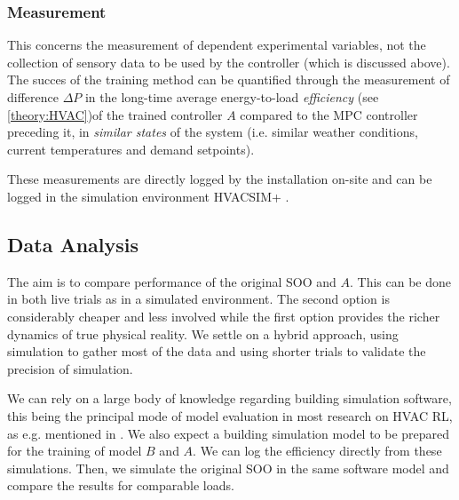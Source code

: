 \documentclass{article}
\theoremstyle{definition}
\theoremstyle{remark}
\begin{document}
\subsubsection{Measurement}\label{Method:DatAn}
This concerns the measurement of dependent experimental variables, not the collection of sensory data to be used by the controller (which is discussed above). The succes of the training method can be quantified through the measurement of difference $\Delta P$ in the long-time average energy-to-load \textit{efficiency} (see \ref{theory:HVAC})of the trained controller $A$ compared to the MPC controller preceding it, in \textit{similar states} of the system (i.e. similar weather conditions, current temperatures and demand setpoints).

These measurements are directly logged by the installation on-site and can be logged in the simulation environment HVACSIM+ \cite{Galler_2021}.

\subsection{Data Analysis}
The aim is to compare performance of the original SOO and $A$. This can be done in both live trials as in a simulated environment. The second option is considerably cheaper and less involved while the first option provides the richer dynamics of true physical reality. We settle on a hybrid approach, using simulation to gather most of the data and using shorter trials to validate the precision of simulation.

We can rely on a large body of knowledge regarding building simulation software, this being the principal mode of model evaluation in most research on HVAC RL, as e.g. mentioned in \cite{Yuetal}. We also expect a building simulation model to be prepared for the training of model $B$ and $A$. We can log the efficiency directly from these simulations. Then, we simulate the original SOO in the same software model and compare the results for comparable loads.
\end{document}
